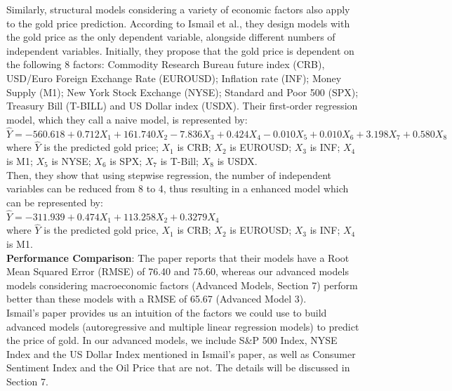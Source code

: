 \documentclass[runningheads]{llncs}
\begin{document}
\noindent Similarly, structural models considering a variety of economic factors also apply to the gold price prediction. According to Ismail et al.\cite{gold-Ismail}, they design models with the gold price as the only dependent variable, alongside different numbers of independent variables. Initially, they propose that the gold price is dependent on the following 8 factors: Commodity Research Bureau future index (CRB), USD/Euro Foreign Exchange Rate (EUROUSD); Inflation rate (INF); Money Supply (M1); New York Stock Exchange (NYSE); Standard and Poor 500 (SPX); Treasury Bill (T-BILL) and US Dollar index (USDX). Their first-order regression model, which they call a naive model, is represented by: \\

$\hat{Y}=-560.618+0.712X_1+161.740X_2-7.836X_3 +0.424X_4-0.010X_5+0.010X_6+3.198X_7+0.580X_8$ \\	

where $\hat{Y}$ is the predicted gold price; $X_1$ is CRB; $X_2$ is EUROUSD; $X_3$ is INF; $X_4$ is M1; $X_5$ is NYSE; $X_6$ is SPX; $X_7$ is T-Bill; $X_8$ is USDX.\\

\noindent Then, they show that using stepwise regression, the number of independent variables can be reduced from 8 to 4, thus resulting in a enhanced model which can be represented by:  \\

$\hat{Y}=-311.939+0.474X_1+113.258X_2+0.3279X_4$ \\

where $\hat{Y}$ is the predicted gold price, $X_1$ is CRB; $X_2$ is EUROUSD; $X_3$ is INF; $X_4$ is M1. \\

\noindent \textbf{Performance Comparison}: The paper reports that their models have a Root Mean Squared Error (RMSE) of 76.40 and 75.60, whereas our advanced models models considering macroeconomic factors (Advanced Models, Section 7) perform better than these models with a RMSE of 65.67 (Advanced Model 3). \\

\noindent Ismail's paper provides us an intuition of the factors we could use to build advanced models (autoregressive and multiple linear regression models) to predict the price of gold. In our advanced models, we include S\&P 500 Index, NYSE Index and the US Dollar Index mentioned in Ismail's paper, as well as Consumer Sentiment Index and the Oil Price that are not. The details will be discussed in Section 7.\\
\end{document}
